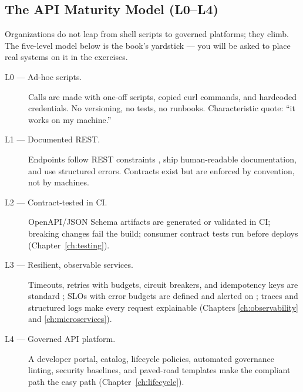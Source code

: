 \subsection{The API Maturity Model (L0--L4)}
\label{sec:ch0-maturity}

Organizations do not leap from shell scripts to governed platforms; they
climb. The five-level model below is the book's yardstick --- you will be
asked to place real systems on it in the exercises.

\begin{description}
  \item[L0 --- Ad-hoc scripts.] Calls are made with one-off scripts, copied
    curl commands, and hardcoded credentials. No versioning, no tests, no
    runbooks. Characteristic quote: ``it works on my machine.''
  \item[L1 --- Documented REST.] Endpoints follow REST constraints
    \cite{fielding2000rest}, ship human-readable documentation, and use
    structured errors. Contracts exist but are enforced by convention, not
    by machines.
  \item[L2 --- Contract-tested in CI.] OpenAPI/JSON Schema artifacts are
    generated or validated in CI; breaking changes fail the build; consumer
    contract tests run before deploys (Chapter~\ref{ch:testing}).
  \item[L3 --- Resilient, observable services.] Timeouts, retries with
    budgets, circuit breakers, and idempotency keys are standard
    \cite{nygard2018releaseit}; SLOs with error budgets are defined and
    alerted on \cite{beyer2016sre}; traces and structured logs make every
    request explainable (Chapters \ref{ch:observability} and
    \ref{ch:microservices}).
  \item[L4 --- Governed API platform.] A developer portal, catalog,
    lifecycle policies, automated governance linting, security baselines,
    and paved-road templates make the compliant path the easy path
    (Chapter~\ref{ch:lifecycle}).
\end{description}

